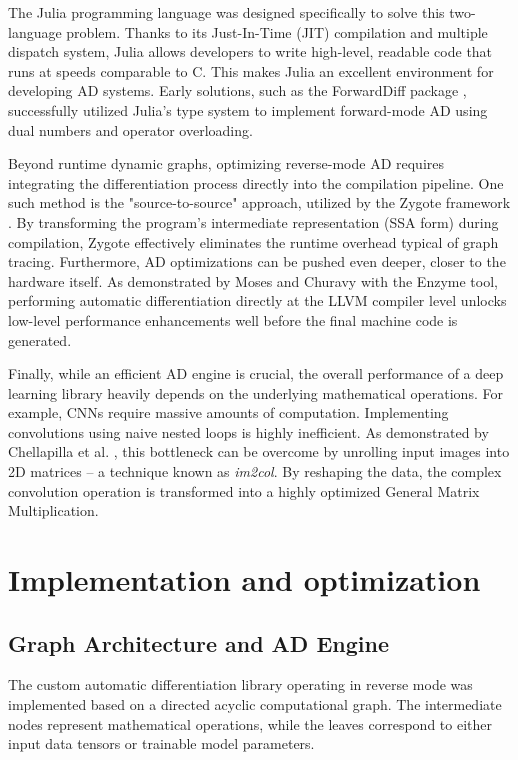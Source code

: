 \documentclass[conference]{IEEEtran}
\begin{document}
The Julia programming language \cite{bezanson2017} was designed specifically to solve this two-language problem. Thanks to its Just-In-Time (JIT) compilation and multiple dispatch system, Julia allows developers to write high-level, readable code that runs at speeds comparable to C. This makes Julia an excellent environment for developing AD systems. Early solutions, such as the ForwardDiff package \cite{revels2016}, successfully utilized Julia's type system to implement forward-mode AD using dual numbers and operator overloading. 

Beyond runtime dynamic graphs, optimizing reverse-mode AD requires integrating the differentiation process directly into the compilation pipeline. One such method is the "source-to-source" approach, utilized by the Zygote framework \cite{innes2018_zygote}. By transforming the program's intermediate representation (SSA form) during compilation, Zygote effectively eliminates the runtime overhead typical of graph tracing. Furthermore, AD optimizations can be pushed even deeper, closer to the hardware itself. As demonstrated by Moses and Churavy \cite{moses2020} with the Enzyme tool, performing automatic differentiation directly at the LLVM compiler level unlocks low-level performance enhancements well before the final machine code is generated.

Finally, while an efficient AD engine is crucial, the overall performance of a deep learning library heavily depends on the underlying mathematical operations. For example, CNNs require massive amounts of computation. Implementing convolutions using naive nested loops is highly inefficient. As demonstrated by Chellapilla et al. \cite{chellapilla2006}, this bottleneck can be overcome by unrolling input images into 2D matrices -- a technique known as \textit{im2col}. By reshaping the data, the complex convolution operation is transformed into a highly optimized General Matrix Multiplication.
\section{Implementation and optimization}

\subsection{Graph Architecture and AD Engine}

The custom automatic differentiation library operating in reverse mode was implemented based on a directed acyclic computational graph. The intermediate nodes represent mathematical operations, while the leaves correspond to either input data tensors or trainable model parameters.
\end{document}
